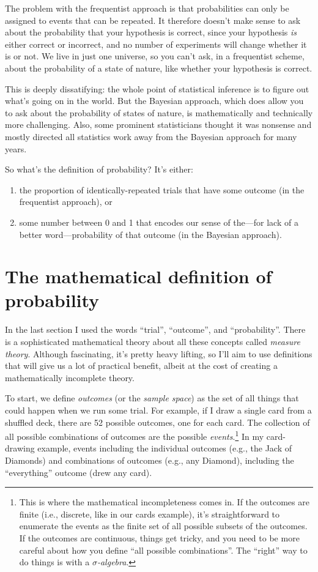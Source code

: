 The problem with the frequentist approach is that probabilities can only be
assigned to events that can be repeated. It therefore doesn't make sense to
ask about the probability that your hypothesis is correct, since your
hypothesis \emph{is} either correct or incorrect, and no number of experiments
will change whether it is or not. We live in just one universe, so you can't
ask, in a frequentist scheme, about the probability of a state of nature, like
whether your hypothesis is correct.

This is deeply dissatifying: the whole point of statistical inference is to
figure out what's going on in the world. But the Bayesian approach, which does
allow you to ask about the probability of states of nature, is mathematically
and technically more challenging. Also, some prominent statisticians thought
it was nonsense and mostly directed all statistics work away from the Bayesian
approach for many years.

So what's the definition of probability? It's either:
\begin{enumerate}
\item the proportion of identically-repeated trials that have some outcome (in the frequentist approach), or
\item some number between 0 and 1 that encodes our sense of the---for lack of a better word---probability of that outcome (in the Bayesian approach).
\end{enumerate}

\section{The mathematical definition of probability}

In the last section I used the words ``trial'', ``outcome'', and
``probability''.  There is a sophisticated mathematical theory about all these
concepts called \emph{measure theory}. Although fascinating, it's pretty heavy
lifting, so I'll aim to use definitions that will give us a lot of practical
benefit, albeit at the cost of creating a mathematically incomplete theory.

To start, we define \emph{outcomes} (or the \emph{sample space}) as the set of all things that could happen
when we run some trial. For example, if I draw a single card from a shuffled
deck, there are 52 possible outcomes, one for each card. The collection of all
possible combinations of outcomes are the possible
\emph{events}.\footnote{This is where the mathematical incompleteness comes
in. If the outcomes are finite (i.e., discrete, like in our cards example),
it's straightforward to enumerate the events as the finite set of all possible
subsets of the outcomes. If the outcomes are continuous, things get tricky,
and you need to be more careful about how you define ``all possible
combinations''. The ``right'' way to do things is with a
\emph{$\sigma$-algebra}.} In my card-drawing example, events including the
individual outcomes (e.g., the Jack of Diamonds) and combinations of outcomes
(e.g., any Diamond), including the ``everything'' outcome (drew any card).

